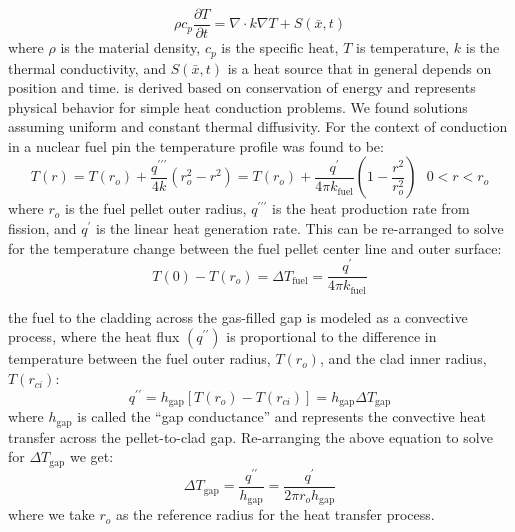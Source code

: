 \begin{equation}
\rho c_p \frac{\partial T}{\partial t} = \nabla \cdot k \nabla T + S(\bar{x},t)
\label{eq:heat_eqn}
\end{equation}
where $\rho$ is the material density, $c_p$ is the specific heat, $T$ is temperature, $k$ is the thermal conductivity, and $S(\bar{x},t)$ is a heat source that in general depends on position and time.
 
 is derived based on conservation of energy and represents physical behavior for simple heat conduction problems.  We found solutions assuming uniform and constant thermal diffusivity.  For the context of conduction in a nuclear fuel pin the temperature profile was found to be:
$$T(r) = T(r_o) + \frac{q^{\prime \prime \prime}}{4k}\left(r_o^2 - r^2\right) = T(r_o) + \frac{q^{\prime}}{4 \pi k_{\text{fuel}}}\left(1 - \frac{r^2}{r_o^2} \right) \ \ \ 0 < r < r_o $$
where $r_o$ is the fuel pellet outer radius, $q^{\prime \prime \prime}$ is the heat production rate from fission, and $q^{\prime}$ is the linear heat generation rate. 
This can be re-arranged to solve for the temperature change between the fuel pellet center line and outer surface:
$$T(0) - T(r_o) = \Delta T_{\text{fuel}} = \frac{q^{\prime}}{4 \pi k_{\text{fuel}}}$$

 the fuel to the cladding across the gas-filled gap is modeled as a convective process, where the heat flux $(q^{\prime \prime})$ is proportional to the difference in temperature between the fuel outer radius, $T(r_o)$, and the clad inner radius, $T(r_{ci})$:
$$q^{\prime \prime} = h_{\text{gap}}\left[T(r_o) - T(r_{ci})\right] = h_{\text{gap}} \Delta T_{\text{gap}}$$
where $h_{\text{gap}}$ is called the ``gap conductance'' and represents the convective heat transfer across the pellet-to-clad gap.  Re-arranging the above equation to solve for $\Delta T_{\text{gap}}$ we get:
$$\Delta T_{\text{gap}} = \frac{q^{\prime \prime}}{h_{\text{gap}}} = \frac{q^{\prime}}{2 \pi r_o h_{\text{gap}}}$$
where we take $r_o$ as the reference radius for the heat transfer process.

